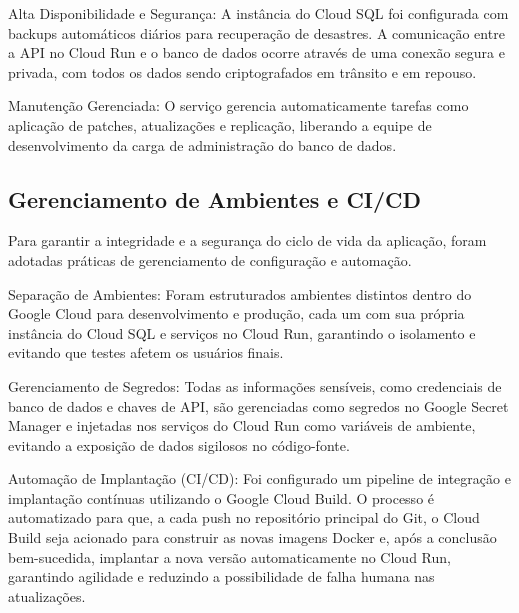 Alta Disponibilidade e Segurança: A instância do Cloud SQL foi configurada com backups automáticos diários para recuperação de desastres. A comunicação entre a API no Cloud Run e o banco de dados ocorre através de uma conexão segura e privada, com todos os dados sendo criptografados em trânsito e em repouso.

Manutenção Gerenciada: O serviço gerencia automaticamente tarefas como aplicação de patches, atualizações e replicação, liberando a equipe de desenvolvimento da carga de administração do banco de dados.

\subsection{Gerenciamento de Ambientes e CI/CD}

Para garantir a integridade e a segurança do ciclo de vida da aplicação, foram adotadas práticas de gerenciamento de configuração e automação.

Separação de Ambientes: Foram estruturados ambientes distintos dentro do Google Cloud para desenvolvimento e produção, cada um com sua própria instância do Cloud SQL e serviços no Cloud Run, garantindo o isolamento e evitando que testes afetem os usuários finais.

Gerenciamento de Segredos: Todas as informações sensíveis, como credenciais de banco de dados e chaves de API, são gerenciadas como segredos no Google Secret Manager e injetadas nos serviços do Cloud Run como variáveis de ambiente, evitando a exposição de dados sigilosos no código-fonte.

Automação de Implantação (CI/CD): Foi configurado um pipeline de integração e implantação contínuas utilizando o Google Cloud Build. O processo é automatizado para que, a cada push no repositório principal do Git, o Cloud Build seja acionado para construir as novas imagens Docker e, após a conclusão bem-sucedida, implantar a nova versão automaticamente no Cloud Run, garantindo agilidade e reduzindo a possibilidade de falha humana nas atualizações.